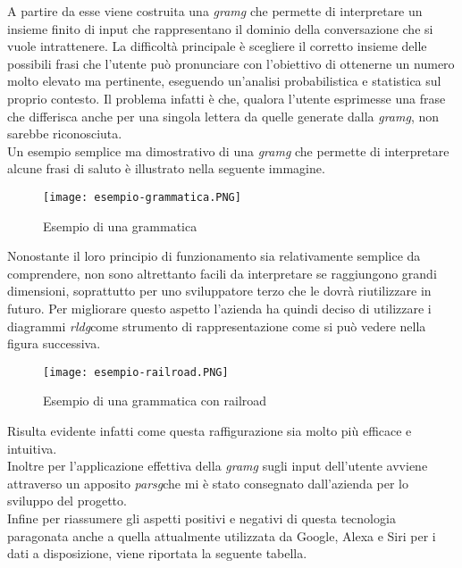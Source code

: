 A partire da esse viene costruita una \emph{\gls{gramg}} che permette di interpretare un insieme finito di input che rappresentano il dominio della conversazione che si vuole intrattenere. La difficoltà principale è scegliere il corretto insieme delle possibili frasi che l'utente può pronunciare con l'obiettivo di ottenerne un numero molto elevato ma pertinente, eseguendo un'analisi probabilistica e statistica sul proprio contesto. Il problema infatti è che, qualora l'utente esprimesse una frase che differisca anche per una singola lettera da quelle generate dalla \emph{\gls{gramg}}, non sarebbe riconosciuta. \\
Un esempio semplice ma dimostrativo di una \emph{\gls{gramg}} che permette di interpretare alcune frasi di saluto è illustrato nella seguente immagine.

\begin{figure}[htbp]
	\begin{center}
		\texttt{[image: esempio-grammatica.PNG]}
		\caption{Esempio di una grammatica}
	\end{center}
\end{figure}

\vspace{2cm}

Nonostante il loro principio di funzionamento sia relativamente semplice da comprendere, non sono altrettanto facili da interpretare se raggiungono grandi dimensioni, soprattutto per uno sviluppatore terzo che le dovrà riutilizzare in futuro. Per migliorare questo aspetto l'azienda ha quindi deciso di utilizzare i diagrammi \emph{\gls{rldg}}\glsfirstoccur come strumento di rappresentazione come si può vedere nella figura successiva.

\begin{figure}[htbp]
	\begin{center}
		\texttt{[image: esempio-railroad.PNG]}
		\caption{Esempio di una grammatica con railroad}
	\end{center}
\end{figure}

Risulta evidente infatti come questa raffigurazione sia molto più efficace e intuitiva. \\
Inoltre per l'applicazione effettiva della \emph{\gls{gramg}} sugli input dell'utente avviene attraverso un apposito \emph{\gls{parsg}}\glsfirstoccur che mi è stato consegnato dall'azienda per lo sviluppo del progetto. \\
Infine per riassumere gli aspetti positivi e negativi di questa tecnologia paragonata anche a quella attualmente utilizzata da Google, Alexa e Siri per i dati a disposizione, viene riportata la seguente tabella.


